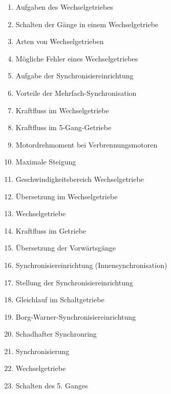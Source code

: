 \begin{enumerate}
\item
  Aufgaben des Wechselgetriebes\\
\item
  Schalten der Gänge in einem Wechselgetriebe\\
\item
  Arten von Wechselgetrieben\\
\item
  Mögliche Fehler eines Wechselgetriebes\\
\item
  Aufgabe der Synchronisiereinrichtung\\
\item
  Vorteile der Mehrfach-Synchronisation\\
\item
  Kraftfluss im Wechselgetriebe\\
\item
  Kraftfluss im 5-Gang-Getriebe\\
\item
  Motordrehmoment bei Verbrennungsmotoren\\
\item
  Maximale Steigung\\
\item
  Geschwindigkeitsbereich Wechselgetriebe\\
\item
  Übersetzung im Wechselgetriebe\\
\item
  Wechselgetriebe\\
\item
  Kraftfluss im Getriebe\\
\item
  Übersetzung der Vorwärtsgänge\\
\item
  Synchronisiereinrichtung (Innensynchronisation)\\
\item
  Stellung der Synchronisiereinrichtung\\
\item
  Gleichlauf im Schaltgetriebe\\
\item
  Borg-Warner-Synchronisiereinrichtung\\
\item
  Schadhafter Synchronring\\
\item
  Synchronisierung\\
\item
  Wechselgetriebe\\
\item
  Schalten des 5. Ganges
\end{enumerate}


